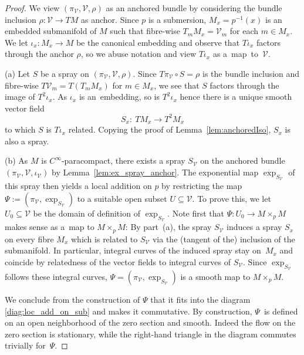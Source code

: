 \documentclass[11pt]{article}
\numberwithin{equation}{section}
\numberwithin{equation}{section}
\newcommand{\cV}{\ensuremath{\mathcal{V}}}
\begin{document}
\begin{proof} We view $(\pi_{\cV},\cV,\rho)$ as an anchored bundle by considering the bundle inclusion ${\rho \colon\! \cV \!\rightarrow\! TM}$ as anchor. Since $p$ is a submersion, $M_x= p^{-1}(x)$ is an embedded submanifold of $M$ such that fibre-wise $T_m M_x = \cV_m$ for each $m \in M_x$. We let $\iota_x \colon M_x \rightarrow M$ be the canonical embedding and observe that $T\iota_x$ factors through the anchor $\rho$, so we abuse notation and view $T\iota_x$ as a~map~to~$\cV$.

(a) Let $S$ be a spray on $(\pi_\cV, \cV, \rho)$. Since $T\pi_\cV \circ S = \rho$ is the bundle inclusion and fibre-wise $T\cV_m = T(T_m M_x)$ for $m \in M_x$, we see that $S$ factors through the image of $T^2 \iota_x$.
As $\iota_x$ is an~embedding, so is $T^2\iota_x$ hence there is a unique smooth vector field
\begin{displaymath}S_x \colon\ T M_x \rightarrow T^2M_x\end{displaymath}
to which $S$ is $T\iota_x$ related. Copying the proof of Lemma~\ref{lem:anchoredIso}, $S_x$ is also a spray.

(b) As $M$ is $C^\infty$-paracompact, there exists a spray $S_\cV$ on the anchored bundle $(\pi_\cV,\cV,\iota_{\cV})$ by Lemma~\ref{lem:ex_spray_anchor}.
The exponential map $\exp_{S_\cV}$ of this spray then yields a local addition on $p$ by restricting the map $\Psi := (\pi_{\cV}, \exp_{S_\cV})$ to a suitable open subset $U \subseteq \mathcal{V}$. To prove this, we let~${U_{0} \subseteq \mathcal{V}}$ be the domain of definition of $\exp_{S_{\cV}}$.
Note first that $\Psi \colon U_{0} \rightarrow M \times_p M$ makes sense as a~map to $M \times_p M$: By part~(a), the spray $S_\cV$ induces a spray $S_x$ on every fibre $M_x$ which is related to $S_\cV$ via the (tangent of the) inclusion of the submanifold. In particular, integral curves of the induced spray stay on~$M_x$ and coincide by relatedness of the vector fields to integral curves of $S_\cV$. Since $\exp_{S_\cV}$ follows these integral curves, $\Psi= (\pi_{\cV},\exp_{S_\cV})$ is a smooth map to $M\times_p M$.

We conclude from the construction of $\Psi$ that it fits into the diagram \eqref{diag:loc_add_on_sub} and makes it commutative. By construction, $\Psi$~is defined on an open neighborhood of the zero section and smooth. Indeed the flow on the zero section is stationary, while the right-hand triangle in the diagram commutes trivially for~$\Psi$.


\end{proof}
\end{document}
